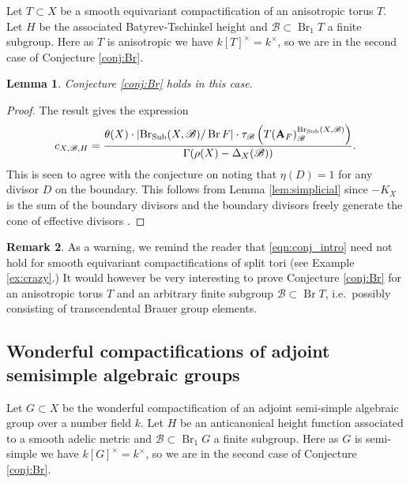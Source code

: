 \documentclass[a4paper,12pt,reqno]{amsart}
\numberwithin{equation}{section} \numberwithin{figure}{section}
\DeclareMathOperator{\Br}{Br} \DeclareMathOperator{\Brnr}{Br_{nr}}
\newcommand{\Adele}{\mathbf{A}}
\newcommand{\br}{\mathscr{B}}
\renewcommand{\#}{\sharp}
\newtheorem{lemma}{Lemma}
\theoremstyle{definition}
\newtheorem{remark}[lemma]{Remark}
\numberwithin{lemma}{section}
\begin{document}
Let $T \subset X$ be a smooth equivariant compactification of an anisotropic torus $T$.
Let $H$ be the associated Batyrev-Tschinkel height and $\br \subset \Br_1 T$ a finite
subgroup. Here as $T$ is anisotropic we have $k[T]^\times = k^\times$, so we are in the second
case of Conjecture \ref{conj:Br}.

\begin{lemma}
	Conjecture \ref{conj:Br} holds in this case.
\end{lemma}
\begin{proof}
	The result \cite[Thm.~5.15]{Lou18} gives the expression
    $$c_{X,\br,H}=\frac{\theta(X)\cdot\mathopen|\Sub(X,\br)/\Br F\mathclose|\cdot \tau_\br\left(T(\Adele_F)_\br^{\Sub(X,\br)}\right)}{\Gamma(\rho(X) - \Delta_X(\br))}.$$
    This is seen to agree with the conjecture on noting that $\eta(D) = 1$ for any
    divisor $D$ on the boundary. This follows from Lemma \ref{lem:simplicial}
    since $-K_X$ is the sum of the boundary divisors 
    and the boundary divisors freely generate the cone of effective divisors
    \cite[Prop.~1.2.12, Prop.~1.3.11]{BT95}.
\end{proof}

\begin{remark}
	As a warning, we remind the reader that \eqref{eqn:conj_intro}
	need not hold for smooth equivariant compactifications of split tori
	(see Example \ref{ex:crazy}.) It would however be very  interesting to prove Conjecture
	\ref{conj:Br} for an anisotropic torus $T$ and an arbitrary finite subgroup $\br \subset
	\Br T$, i.e.~possibly consisting of transcendental Brauer group elements.
\end{remark}


\subsection{Wonderful compactifications of adjoint semisimple algebraic groups} \label{sec:wonderful}

Let $G \subset X$ be the wonderful compactification of an adjoint semi-simple algebraic group
over a number field $k$.  Let $H$ be an anticanonical height function associated to a smooth adelic metric and $\br \subset \Br_1 G$ a finite subgroup.
Here as $G$ is semi-simple we have $k[G]^\times = k^\times$, so we are in the second
case  of Conjecture \ref{conj:Br}.
\end{document}
